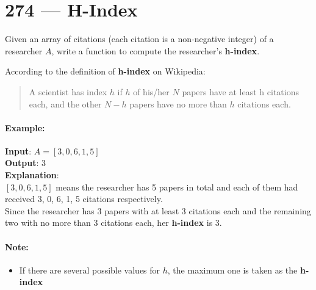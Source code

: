 \section{274 --- H-Index}
Given an array of citations (each citation is a non-negative integer) of a researcher $A$, write a function to compute the researcher's \textbf{h-index}.
\par
According to the definition of \textbf{h-index} on Wikipedia:
\begin{quote}
 A scientist has index $h$ if $h$ of his/her $N$ papers have at least h citations each, and the other $N - h$ papers have no more than $h$ citations each.
\end{quote}

\paragraph{Example:}

\begin{flushleft}
\textbf{Input}: $A = [3,0,6,1,5]$
\\
\textbf{Output}: 3 
\\
\textbf{Explanation}: 
\\
$[3,0,6,1,5]$ means the researcher has 5 papers in total and each of them had received 3, 0, 6, 1, 5 citations respectively. 
\\
Since the researcher has 3 papers with at least 3 citations each and the remaining two with no more than 3 citations each, her \textbf{h-index} is 3.
\end{flushleft}
\paragraph{Note:} 
\begin{itemize}
\item If there are several possible values for $h$, the maximum one is taken as the \textbf{h-index}
\end{itemize}
